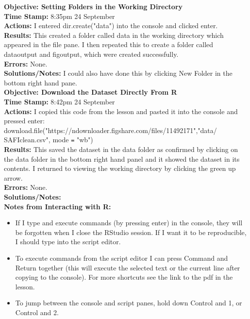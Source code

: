\documentclass{article}
\begin{document}
\begin{FlushLeft}
\vspace{5mm}
\textbf{Objective: Setting Folders in the Working Directory}\\ 
\textbf{Time Stamp:} 8:35pm 24 September\\
\textbf{Actions:} I entered dir.create("data") into the console and clicked enter. \\
\textbf{Results:} This created a folder called data in the working directory which appeared in the file pane. I then repeated this to create a folder called data\textunderscore output and fig\textunderscore output, which were created successfully.\\
\textbf{Errors:} None.\\
\textbf{Solutions/Notes:} I could also have done this by clicking New Folder in the bottom right hand pane.\\
\vspace{5mm}
\textbf{Objective: Download the Dataset Directly From R}\\ 
\textbf{Time Stamp:} 8:42pm 24 September\\
\textbf{Actions:} I copied this code from the lesson and pasted it into the console and pressed enter:\\ download.file("https://ndownloader.figshare.com/files/11492171","data/\\SAFI\textunderscore clean.csv", mode \verb|=| "wb")\\
\textbf{Results:} This saved the dataset in the data folder as confirmed by clicking on the data folder in the bottom right hand panel and it showed the dataset in its contents. I returned to viewing the working directory by clicking the green up arrow.\\
\textbf{Errors:} None.\\
\textbf{Solutions/Notes:}\\
\vspace{5mm}
\textbf{Notes from Interacting with R:} 
\begin{itemize}
    \item If I type and execute commands (by pressing enter) in the console, they will be forgotten when I close the RStudio session. If I want it to be reproducible, I should type into the script editor.
    \item To execute commands from the script editor I can press Command and Return together (this will execute the selected text or the current line after copying to the console). For more shortcuts see the link to the pdf in the lesson.
    \item To jump between the console and script panes, hold down Control and 1, or Control and 2.

\end{itemize}
\end{FlushLeft}
\end{document}
